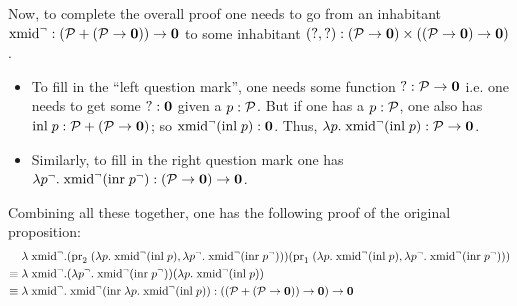 Now, to complete the overall proof one needs to go from an inhabitant $\text{xmid}^{\neg} : (\mathcal{P} + (\mathcal{P} \to \textbf{0})) \to \textbf{0}$ to some inhabitant $(?,?) : (\mathcal{P} \to \textbf{0}) \times ((\mathcal{P} \to \textbf{0}) \to \textbf{0})$.
\begin{itemize}
\item To fill in the ``left question mark'', one needs some function $? : \mathcal{P} \to \textbf{0}$ i.e. one needs to get some $? : \textbf{0}$ given a $p : \mathcal{P}$. But if one has a $p : \mathcal{P}$, one also has $\text{inl}\;p : \mathcal{P} + (\mathcal{P} \to \textbf{0})$; so $\text{xmid}^{\neg}(\text{inl}\;p) : \textbf{0}$. Thus, $\lambda p.\;\text{xmid}^{\neg}(\text{inl}\;p) : \mathcal{P} \to \textbf{0}$.
\item Similarly, to fill in the right question mark one has $\lambda p^{\neg}.\;\text{xmid}^{\neg}(\text{inr}\;p^{\neg}) : (\mathcal{P} \to \textbf{0}) \to \textbf{0}$.
\end{itemize}

Combining all these together, one has the following proof of the original proposition:
\begin{align*}
	&\lambda \;\text{xmid}^{\neg}. (\text{pr}_{2}\;(\lambda p.\;\text{xmid}^{\neg}(\text{inl}\;p),\lambda p^{\neg}.\;\text{xmid}^{\neg}(\text{inr}\;p^{\neg})))(\text{pr}_{1}\;(\lambda p.\;\text{xmid}^{\neg}(\text{inl}\;p),\lambda p^{\neg}.\;\text{xmid}^{\neg}(\text{inr}\;p^{\neg}))) \\
	\equiv \; &\lambda \;\text{xmid}^{\neg}. (\lambda p^{\neg}.\;\text{xmid}^{\neg}(\text{inr}\;p^{\neg}))(\lambda p.\;\text{xmid}^{\neg}(\text{inl}\;p)) \\
	\equiv \; &\lambda \;\text{xmid}^{\neg}. \;\text{xmid}^{\neg}(\text{inr}\;\lambda p.\;\text{xmid}^{\neg}(\text{inl}\;p)) : ((\mathcal{P} + (\mathcal{P} \to \textbf{0})) \to \textbf{0}) \to \textbf{0}
\end{align*}
